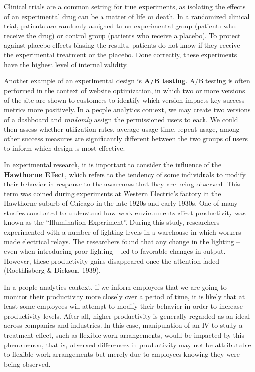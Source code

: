\documentclass[
]{book}
\begin{document}
Clinical trials are a common setting for true experiments, as isolating the effects of an experimental drug can be a matter of life or death. In a randomized clinical trial, patients are randomly assigned to an experimental group (patients who receive the drug) or control group (patients who receive a placebo). To protect against placebo effects biasing the results, patients do not know if they receive the experimental treatment or the placebo. Done correctly, these experiments have the highest level of internal validity.

Another example of an experimental design is \textbf{A/B testing}. A/B testing is often performed in the context of website optimization, in which two or more versions of the site are shown to customers to identify which version impacts key success metrics more positively. In a people analytics context, we may create two versions of a dashboard and \emph{randomly} assign the permissioned users to each. We could then assess whether utilization rates, average usage time, repeat usage, among other success measures are significantly different between the two groups of users to inform which design is most effective.

In experimental research, it is important to consider the influence of the \textbf{Hawthorne Effect}, which refers to the tendency of some individuals to modify their behavior in response to the awareness that they are being observed. This term was coined during experiments at Western Electric's factory in the Hawthorne suburb of Chicago in the late 1920s and early 1930s. One of many studies conducted to understand how work environments effect productivity was known as the ``Illumination Experiment''. During this study, researchers experimented with a number of lighting levels in a warehouse in which workers made electrical relays. The researchers found that any change in the lighting -- even when introducing poor lighting -- led to favorable changes in output. However, these productivity gains disappeared once the attention faded (Roethlisberg \& Dickson, 1939).

In a people analytics context, if we inform employees that we are going to monitor their productivity more closely over a period of time, it is likely that at least some employees will attempt to modify their behavior in order to increase productivity levels. After all, higher productivity is generally regarded as an ideal across companies and industries. In this case, manipulation of an IV to study a treatment effect, such as flexible work arrangements, would be impacted by this phenomenon; that is, observed differences in productivity may not be attributable to flexible work arrangements but merely due to employees knowing they were being observed.
\end{document}
